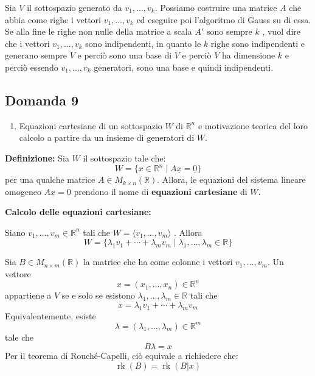 \documentclass[
  a4paper,
]{article}
\providecommand{\tightlist}{%
  \setlength{\itemsep}{0pt}\setlength{\parskip}{0pt}}
\providecommand{\tightlist}{}
\begin{document}
Sia \(V\) il sottospazio generato da \(v_1,\ldots,v_k\). Possiamo
costruire una matrice \(A\) che abbia come righe i vettori
\(v_1,\ldots,v_k\) ed eseguire poi l'algoritmo di Gauss su di essa. Se
alla fine le righe non nulle della matrice a scala \(A'\) sono sempre
\(k\) , vuol dire che i vettori \(v_1,\ldots,v_k\) sono indipendenti, in
quanto le \(k\) righe sono indipendenti e generano sempre \(V\) e perciò
sono una base di \(V\) e perciò \(V\) ha dimensione \(k\) e perciò
essendo \(v_1,\ldots,v_k\) generatori, sono una base e quindi
indipendenti.

\hypertarget{domanda-9}{%
\subsection{Domanda 9}\label{domanda-9}}

\begin{observationbox}[Domanda]
\begin{enumerate}
\def\labelenumi{\arabic{enumi}.}
\setcounter{enumi}{8}
\tightlist
\item
  Equazioni cartesiane di un sottospazio \(W\) di \(\mathbb{R}^n\) e
  motivazione teorica del loro calcolo a partire da un insieme di
  generatori di \(W\).
\end{enumerate}
\end{observationbox}

\textbf{Definizione:} Sia \(W\) il sottospazio tale che: \[
W=\{x\in\mathbb{R}^n \mid A\underline{x}=\underline{0}\}
\] per una qualche matrice \(A\in M_{k\times n}(\mathbb{R})\). Allora,
le equazioni del sistema lineare omogeneo
\(A\underline{x}=\underline{0}\) prendono il nome di \textbf{equazioni
cartesiane} di \(W\).

\textbf{Calcolo delle equazioni cartesiane:}

Siano \(v_1,\dots,v_m\in\mathbb{R}^n\) tali che
\(W=\langle v_1,\dots,v_m\rangle\) . Allora \[
W=
\{
\lambda_1 v_1 +\cdots+\lambda_m v_m
\mid
\lambda_1,\dots,\lambda_m \in\mathbb{R}
\}
\]

Sia \(B\in M_{n\times m}(\mathbb{R})\) la matrice che ha come colonne i
vettori \(v_1,\dots,v_m\). Un vettore \[
x=(x_1,\dots,x_n)\in\mathbb{R}^n
\] appartiene a \(V\) se e solo se esistono
\(\lambda_1,\dots,\lambda_m\in\mathbb{R}\) tali che \[
x=\lambda_1v_1+\cdots+\lambda_mv_m
\] Equivalentemente, esiste \[
\lambda=(\lambda_1,\dots,\lambda_m)\in\mathbb{R}^m
\] tale che \[
B\lambda=x
\] Per il teorema di Rouché-Capelli, ciò equivale a richiedere che: \[
\operatorname{rk}(B)=\operatorname{rk}(B|x)
\]
\end{document}
